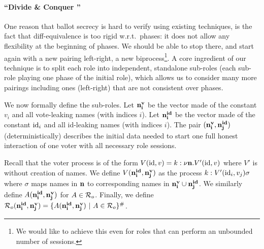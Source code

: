 \paragraph{\textbf{``Divide \& Conquer%
''}}
One reason that ballot secrecy is hard to verify using existing
techniques, is the fact that diff-equivalence
is too rigid w.r.t.~phases: it does not allow any flexibility at
the beginning of phases.
We should be able to stop there, and start again with a new pairing
left-right, a new biprocess\footnote{We would like to achieve this even
for roles that can perform an unbounded number of sessions.}.
A core ingredient of our technique is to split each role
into independent, standalone sub-roles (each sub-role playing one phase of the initial role), which allows us 
to consider many more pairings including ones (left-right)
that are not consistent over phases.

We now formally define the sub-roles.
Let ${\mathbf{n^{v}_{i}}}$ be the vector made of the constant $v_i$ and all vote-leaking names (with indices $i$).
Let ${\mathbf{n^{id}_{i}}}$ be the vector made of the constant $\mathrm{id}_i$ and all id-leaking names (with indices $i$).
The pair $({\mathbf{n^{v}_{i}}},{\mathbf{n^{id}_{j}}})$ (deterministically) describes the initial data needed to start one full honest interaction of one voter with
all necessary role sessions.


\begin{definition}
\label{def:sub-parts}
Recall that the voter process is of the form
$V(\mathrm{id},v)=k: \nu{\mathbf{n}}.V'(\mathrm{id},v)$
where $V'$ is without creation of names.
We define $V({\mathbf{n^{id}_{i}}},{\mathbf{n^{v}_{j}}})$ as the process $k: V'(\mathrm{id}_i,v_j)\sigma$
where $\sigma$ maps names in ${\mathbf{n}}$ to corresponding names in ${\mathbf{n^{v}_{i}}}\cup{\mathbf{n^{id}_{j}}}$.
We similarly define $A({\mathbf{n^{id}_{i}}},{\mathbf{n^{v}_{j}}})$ for $A\in\mathcal{R}_o$.
Finally, we define $\roles_o(\nID{i},\nV{j})=\{A(\nID{i},\nV{j})\ |\ A\in\roles_o\}^\#$.
\end{definition}

